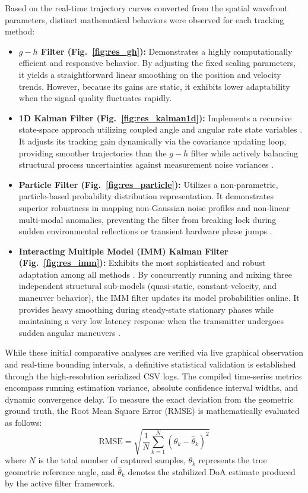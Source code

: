 \documentclass[conference]{IEEEtran}
\begin{document}
\clearpage 

Based on the real-time trajectory curves converted from the spatial wavefront parameters, distinct mathematical behaviors were observed for each tracking method:
\begin{itemize}
    \item \textbf{$g-h$ Filter (Fig.~\ref{fig:res_gh}):} Demonstrates a highly computationally efficient and responsive behavior. By adjusting the fixed scaling parameters, it yields a straightforward linear smoothing on the position and velocity trends. However, because its gains are static, it exhibits lower adaptability when the signal quality fluctuates rapidly.
    \item \textbf{1D Kalman Filter (Fig.~\ref{fig:res_kalman1d}):} Implements a recursive state-space approach utilizing coupled angle and angular rate state variables \cite{Zhou2024RealTime}. It adjusts its tracking gain dynamically via the covariance updating loop, providing smoother trajectories than the $g-h$ filter while actively balancing structural process uncertainties against measurement noise variances \cite{Hou2023BayesianDoA}.
    \item \textbf{Particle Filter (Fig.~\ref{fig:res_particle}):} Utilizes a non-parametric, particle-based probability distribution representation. It demonstrates superior robustness in mapping non-Gaussian noise profiles and non-linear multi-modal anomalies, preventing the filter from breaking lock during sudden environmental reflections or transient hardware phase jumps \cite{Zocca2022PFWeight}.
    \item \textbf{Interacting Multiple Model (IMM) Kalman Filter (Fig.~\ref{fig:res_imm}):} Exhibits the most sophisticated and robust adaptation among all methods \cite{Lim2020IMMPF}. By concurrently running and mixing three independent structural sub-models (quasi-static, constant-velocity, and maneuver behavior), the IMM filter updates its model probabilities online. It provides heavy smoothing during steady-state stationary phases while maintaining a very low latency response when the transmitter undergoes sudden angular maneuvers \cite{Hou2023RobustVB-EKF}.
\end{itemize}

While these initial comparative analyses are verified via live graphical observation and real-time bounding intervals, a definitive statistical validation is established through the high-resolution serialized CSV logs. The compiled time-series metrics encompass running estimation variance, absolute confidence interval widths, and dynamic convergence delay. To measure the exact deviation from the geometric ground truth, the Root Mean Square Error (RMSE) is mathematically evaluated as follows:
\begin{equation}
    \text{RMSE} = \sqrt{\frac{1}{N}\sum_{k=1}^{N}(\theta_k-\hat{\theta}_k)^2}
\end{equation}
where $N$ is the total number of captured samples, $\theta_k$ represents the true geometric reference angle, and $\hat{\theta}_k$ denotes the stabilized DoA estimate produced by the active filter framework.
\end{document}
